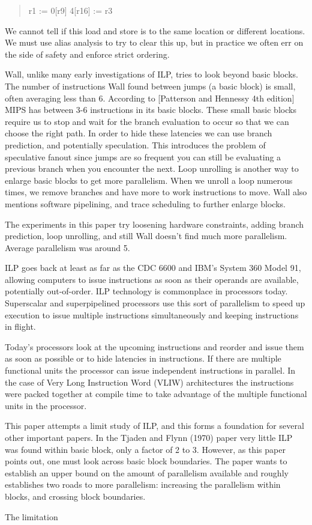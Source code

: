 \documentclass[12pt,twoside,letterpaper]{article}
\begin{document}
\begin{quote}
r1 := 0[r9]
4[r16] := r3
\end{quote}

We cannot tell if this load and store is to the same location or different locations. We must use alias analysis to try to clear this up, but in practice we often err on the side of safety and enforce strict ordering.

Wall, unlike many early investigations of ILP, tries to look beyond basic blocks. The number of instructions Wall found between jumps (a basic block) is small, often averaging less than 6. According to [Patterson and Hennessy 4th edition] MIPS has between 3-6 instructions in its basic blocks. These small basic blocks require us to stop and wait for the branch evaluation to occur so that we can choose the right path. In order to hide these latencies we can use branch prediction, and potentially speculation. This introduces the problem of speculative fanout since jumps are so frequent you can still be evaluating a previous branch when you encounter the next. Loop unrolling is another way to enlarge basic blocks to get more parallelism. When we unroll a loop numerous times, we remove branches and have more to work instructions to move. Wall also mentions software pipelining, and trace scheduling to further enlarge blocks.

The experiments in this paper try loosening hardware constraints, adding branch prediction, loop unrolling, and still Wall doesn’t find much more parallelism. Average parallelism was around 5.








ILP goes back at least as far as the CDC 6600 and IBM’s System 360 Model 91, allowing computers to issue instructions as soon as their operands are available, potentially out-of-order. ILP technology is commonplace in processors today. Superscalar and superpipelined processors use this sort of parallelism to speed up execution to issue multiple instructions simultaneously and keeping instructions in flight.

Today’s processors look at the upcoming instructions and reorder and issue them as soon as possible or to hide latencies in instructions. If there are multiple functional units the processor can issue independent instructions in parallel. In the case of Very Long Instruction Word (VLIW) architectures the instructions were packed together at compile time to take advantage of the multiple functional units in the processor.

This paper attempts a limit study of ILP, and this forms a foundation for several other important papers. In the Tjaden and Flynn (1970) paper very little ILP was found within basic block, only a factor of 2 to 3. However, as this paper points out, one must look across basic block boundaries. The paper wants to establish an upper bound on the amount of parallelism available and roughly establishes two roads to more parallelism: increasing the parallelism within blocks, and crossing block boundaries.

The limitation 
\end{document}

